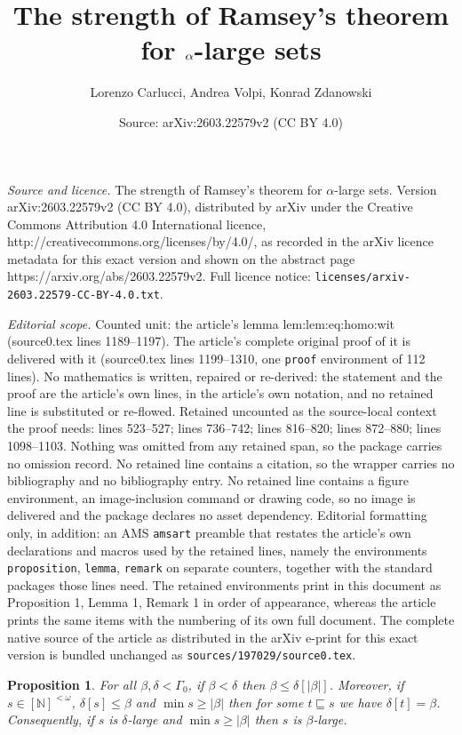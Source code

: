 \documentclass[10pt,a4paper]{amsart}
\title{The strength of Ramsey's theorem for $\a$-large sets}
\author{Lorenzo Carlucci, Andrea Volpi, Konrad Zdanowski}
\date{Source: arXiv:2603.22579v2 (CC BY 4.0)}
\newtheorem{proposition}{Proposition}
\def\G{\Gamma}
\newcommand{\N}{\numberset{N}}
\def\a{\alpha}
\def\b{\beta}
\def\d{\delta}
\newcommand{\numberset}{\mathbb}
\begin{document}
\maketitle

\noindent\emph{Source and licence.} The strength of Ramsey's theorem for $\a$-large sets. Version arXiv:2603.22579v2 (CC BY 4.0), distributed by arXiv under the Creative Commons Attribution 4.0 International licence, http://creativecommons.org/licenses/by/4.0/, as recorded in the arXiv licence metadata for this exact version and shown on the abstract page https://arxiv.org/abs/2603.22579v2. Full licence notice: \texttt{licenses/arxiv-2603.22579-CC-BY-4.0.txt}.\par\smallskip

\noindent\textit{Editorial scope.} Counted unit: the article's lemma lem:lem:eq:homo:wit (source0.tex lines 1189--1197). The article's complete original proof of it is delivered with it (source0.tex lines 1199--1310, one \texttt{proof} environment of 112 lines). No mathematics is written, repaired or re-derived: the statement and the proof are the article's own lines, in the article's own notation, and no retained line is substituted or re-flowed.  Retained uncounted as the source-local context the proof needs: lines 523--527; lines 736--742; lines 816--820; lines 872--880; lines 1098--1103.  Nothing was omitted from any retained span, so the package carries no omission record.  No retained line contains a citation, so the wrapper carries no bibliography and no bibliography entry.  No retained line contains a figure environment, an image-inclusion command or drawing code, so no image is delivered and the package declares no asset dependency.  Editorial formatting only, in addition: an AMS \texttt{amsart} preamble that restates the article's own declarations and macros used by the retained lines, namely the environments \texttt{proposition}, \texttt{lemma}, \texttt{remark} on separate counters, together with the standard packages those lines need.  The retained environments print in this document as Proposition 1, Lemma 1, Remark 1 in order of appearance, whereas the article prints the same items with the numbering of its own full document.  The complete native source of the article as distributed in the arXiv e-print for this exact version is bundled unchanged as \texttt{sources/197029/source0.tex}.
\begin{proposition}\label{prop: goodnorm}
For all $\b, \d < \G_0$, if $\b < \d$ then $\b \le \d[|\b|]$.
Moreover, if $s \in [\N]^{<\omega}$, $\d[s] \le \b$ and $\min s \ge |\b|$ then for some $t \sqsubseteq s$ we have $\d[t] = \b$.
Consequently, if $s$ is $\d$-large and $\min s \ge |\b|$ then $s$ is $\b$-large.
\end{proposition}
\end{document}
